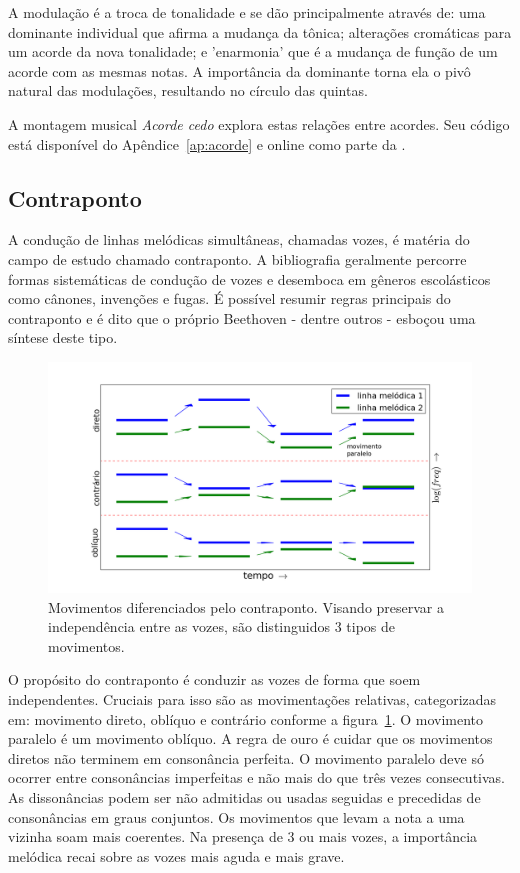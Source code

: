 A modulação é a troca de tonalidade e se dão principalmente através de: uma dominante individual que afirma a mudança da tônica; alterações cromáticas para um acorde da nova tonalidade; e 'enarmonia' que é a mudança de função de um acorde com as mesmas notas. A importância da dominante torna ela o pivô natural das modulações, resultando no círculo das quintas.\cite{Harmonia,Salzer,Koellheuteur,Harmony}

A montagem musical \emph{Acorde cedo} explora estas relações entre acordes. Seu código está disponível do Apêndice~\ref{ap:acorde} e online como parte da \massa.\cite{MASSA}


\subsection{Contraponto}\label{subsec:contraponto}

A condução de linhas melódicas simultâneas, chamadas vozes,
é matéria do campo de estudo chamado contraponto. A bibliografia
geralmente percorre formas sistemáticas de condução de vozes e desemboca em gêneros escolásticos como cânones, invenções e fugas. É possível resumir regras principais do contraponto e é dito que o próprio Beethoven - dentre outros - esboçou uma síntese deste tipo.

\begin{figure}[h!]
    \centering
        \includegraphics[width=\textwidth]{figuras/movContraponto}
    \caption{Movimentos diferenciados pelo contraponto. Visando preservar a independência entre as vozes, são distinguidos 3 tipos de movimentos.}
        \label{fig:movContraponto}
\end{figure}



O propósito do contraponto é conduzir as vozes 
de forma que soem independentes. Cruciais para isso
são as movimentações relativas,
categorizadas em: movimento direto, oblíquo e contrário
conforme a figura~\ref{fig:movContraponto}. O movimento paralelo
é um movimento oblíquo.
A regra de ouro é cuidar que os movimentos diretos
não terminem em consonância perfeita. O movimento paralelo
deve só ocorrer entre consonâncias imperfeitas e não mais
do que três vezes consecutivas. As dissonâncias podem
ser não admitidas ou usadas seguidas 
e precedidas de consonâncias em graus conjuntos.
Os movimentos que levam a nota a uma vizinha soam mais coerentes.
Na presença de 3 ou mais vozes,
a importância melódica recai sobre as vozes mais aguda e mais grave.\cite{Fux,Tragtenberg,SchoenbergContra}

